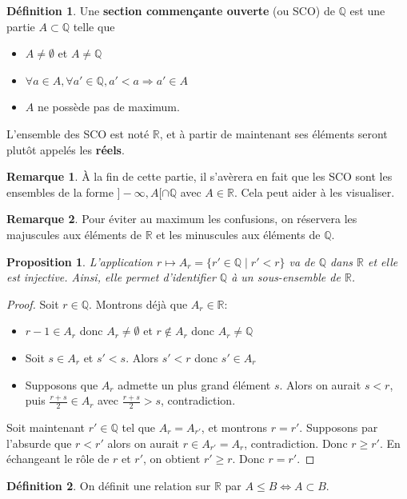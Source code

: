 \documentclass[french]{book}
\theoremstyle{plain}
\newtheorem{prop}{Proposition}[chapter]
\theoremstyle{definition}
\newtheorem{dfn}{Définition}[chapter]
\newtheorem{rmq}{Remarque}[chapter]
\theoremstyle{remark}
\begin{document}
\begin{dfn}
	Une \textbf{section commençante ouverte} (ou SCO) de $\mathbb{Q}$ est une partie $A \subset \mathbb{Q}$ telle que
\begin{itemize}
	\item $A \neq \emptyset$ et $A \neq \mathbb{Q}$
	\item $\forall a \in A, \forall a' \in \mathbb{Q}, a' < a \Rightarrow a' \in A$
	\item $A$ ne possède pas de maximum.
\end{itemize}

L'ensemble des SCO est noté $\mathbb{R}$, et à partir de maintenant ses éléments seront plutôt appelés les \textbf{réels}.
\end{dfn}
\begin{rmq}
	À la fin de cette partie, il s'avèrera en fait que les SCO sont les ensembles de la forme $]-\infty, A[ \cap \mathbb{Q}$ avec $A \in \mathbb{R}$. Cela peut aider à les visualiser.
\end{rmq}
\begin{rmq}
	Pour éviter au maximum les confusions, on réservera les majuscules aux éléments de $\mathbb{R}$ et les minuscules aux éléments de $\mathbb{Q}$.
\end{rmq}
\begin{prop}
	L'application $r \mapsto A_r = \{r' \in \mathbb{Q} \mid r' < r\}$ va de $\mathbb{Q}$ dans $\mathbb{R}$ et elle est injective. Ainsi, elle permet d'identifier $\mathbb{Q}$ à un sous-ensemble de $\mathbb{R}$.
\end{prop}
\begin{proof}
	Soit $r \in \mathbb{Q}$. Montrons déjà que $A_r \in \mathbb{R}$:
\begin{itemize}
	\item $r-1 \in A_r$ donc $A_r \neq \emptyset$ et $r \notin A_r$ donc $A_r \neq \mathbb{Q}$
	\item Soit $s \in A_r$ et $s' < s$. Alors $s' < r$ donc $s' \in A_r$
	\item Supposons que $A_r$ admette un plus grand élément $s$. Alors on aurait $s < r$, puis $\frac{r+s}{2} \in A_r$ avec $\frac{r+s}{2} > s$, contradiction.
\end{itemize}
Soit maintenant $r' \in \mathbb{Q}$ tel que $A_r = A_{r'}$, et montrons $r = r'$. Supposons par l'absurde que $r < r'$ alors on aurait $r \in A_{r'} = A_r$, contradiction. Donc $r \geqslant r'$. En échangeant le rôle de $r$ et $r'$, on obtient $r' \geqslant r$. Donc $r = r'$.
\end{proof}
\begin{dfn}
	On définit une relation sur $\mathbb{R}$ par $A \leqslant B \Leftrightarrow A \subset B$.
\end{dfn}
\end{document}
